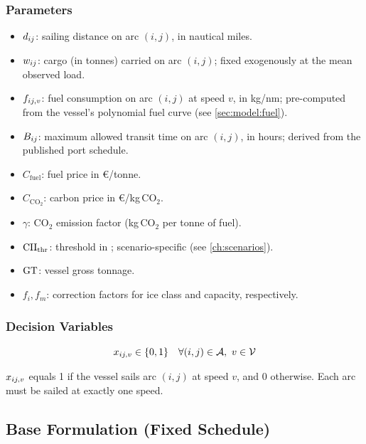 \subsubsection{Parameters}
\label{sec:model:params}

\begin{itemize}
  \item $d_{ij}$: sailing distance on arc $(i,j)$, in nautical miles.
  \item $w_{ij}$: cargo (in tonnes) carried on arc $(i,j)$; fixed
    exogenously at the mean observed load.
  \item $f_{ij,v}$: fuel consumption on arc $(i,j)$ at speed $v$,
    in kg/nm; pre-computed from the vessel's polynomial fuel curve
    (see \cref{sec:model:fuel}).
  \item $B_{ij}$: maximum allowed transit time on arc $(i,j)$,
    in hours; derived from the published port schedule.
  \item $C_{\mathrm{fuel}}$: fuel price in \euro{}/tonne.
  \item $C_{\mathrm{CO}_2}$: \ETS{} carbon price in \euro{}/kg\,CO$_2$.
  \item $\gamma$: CO$_2$ emission factor (kg\,CO$_2$ per tonne of fuel).
  \item $\mathrm{CII}_{\mathrm{thr}}$: \CII{} threshold in \gGTnm{}; scenario-specific
    (see \cref{ch:scenarios}).
  \item $\mathrm{GT}{}$: vessel gross tonnage.
  \item $f_i, f_m$: \IMO{} correction factors for ice class and
    capacity, respectively.
\end{itemize}

\subsubsection{Decision Variables}
\label{sec:model:vars}

\begin{equation}
  x_{ij,v} \in \{0,1\} \quad \forall (i,j) \in \mathcal{A},\ v \in \mathcal{V}
  \label{eq:defx}
\end{equation}

$x_{ij,v}$ equals 1 if the vessel sails arc $(i,j)$ at speed $v$, and 0
otherwise. Each arc must be sailed at exactly one speed.

\subsection{Base Formulation (Fixed Schedule)}
\label{sec:model:base}

